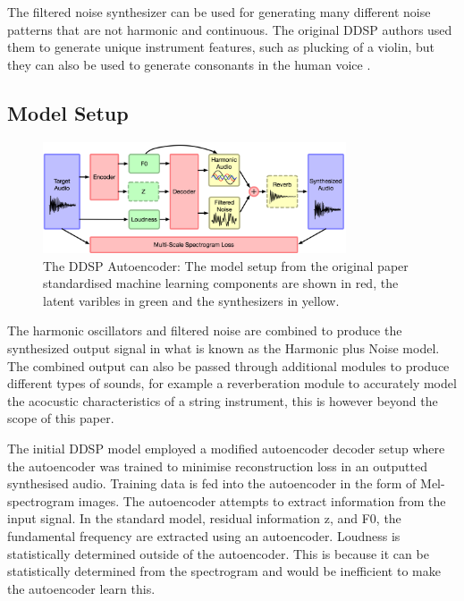 The filtered noise synthesizer can be used for generating many different noise patterns that are not harmonic and continuous. The original DDSP authors used them to generate unique instrument features, such as plucking of a violin, but they can also be used to generate consonants in the human voice \cite{SingingDDSP}.

\subsection{Model Setup}

\begin{figure}
    \centering
    \includegraphics[width=0.8\textwidth]{literature_review/DDSPArchitecture.png}
    \caption{The DDSP Autoencoder: The model setup from the original paper\cite{OriginalDDSP} standardised machine learning components are shown in red, the latent varibles in green and the synthesizers in yellow.}
    \label{fig:ddsp_model_setup}
\end{figure}

The harmonic oscillators and filtered noise are combined to produce the synthesized output signal in what is known as the Harmonic plus Noise model. The combined output can also be passed through additional modules to produce different types of sounds, for example a reverberation module to accurately model the acocustic characteristics of a string instrument, this is however beyond the scope of this paper.

The initial DDSP model\cite{OriginalDDSP} employed a modified autoencoder decoder setup where the autoencoder was trained to minimise reconstruction loss in an outputted synthesised audio. Training data is fed into the autoencoder in the form of Mel-spectrogram images. The autoencoder attempts to extract information from the input signal. In the standard model, residual information z, and F0, the fundamental frequency are extracted using an autoencoder. Loudness is statistically determined outside of the autoencoder. This is because it can be statistically determined from the spectrogram and would be inefficient to make the autoencoder learn this.

